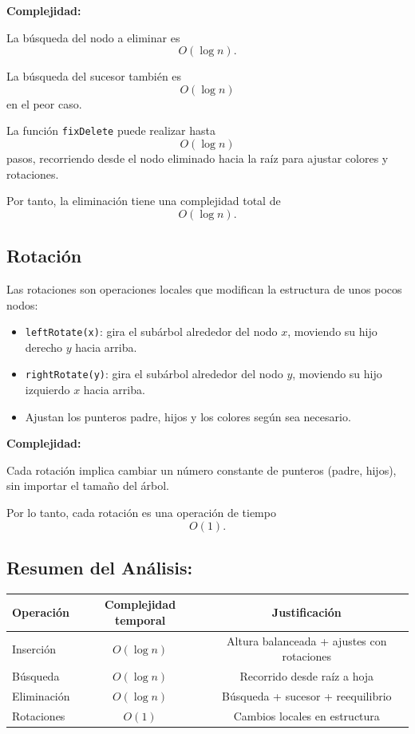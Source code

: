 \documentclass[conference]{IEEEtran}
\begin{document}
\textbf{Complejidad:}

La búsqueda del nodo a eliminar es 
\[
O(\log n).
\]

La búsqueda del sucesor también es 
\[
O(\log n)
\]
en el peor caso.

La función \texttt{fixDelete} puede realizar hasta 
\[
O(\log n)
\]
pasos, recorriendo desde el nodo eliminado hacia la raíz para ajustar colores y rotaciones.

Por tanto, la eliminación tiene una complejidad total de 
\[
O(\log n).
\]



\subsection{Rotación}
Las rotaciones son operaciones locales que modifican la estructura de unos pocos nodos:

\begin{itemize}
    \item \texttt{leftRotate(x)}: gira el subárbol alrededor del nodo \(x\), moviendo su hijo derecho \(y\) hacia arriba.
    \item \texttt{rightRotate(y)}: gira el subárbol alrededor del nodo \(y\), moviendo su hijo izquierdo \(x\) hacia arriba.
    \item Ajustan los punteros padre, hijos y los colores según sea necesario.
\end{itemize}

\textbf{Complejidad:}

Cada rotación implica cambiar un número constante de punteros (padre, hijos), sin importar el tamaño del árbol.

Por lo tanto, cada rotación es una operación de tiempo 
\[
O(1).
\]

\subsection{Resumen del Análisis:}

\begin{table}[h]
\centering
\begin{tabular}{l c c}
\hline
\textbf{Operación} & \textbf{Complejidad temporal} & \textbf{Justificación} \\
\hline
Inserción   & \(O(\log n)\) & Altura balanceada + ajustes con rotaciones \\
Búsqueda    & \(O(\log n)\) & Recorrido desde raíz a hoja \\
Eliminación & \(O(\log n)\) & Búsqueda + sucesor + reequilibrio \\
Rotaciones  & \(O(1)\)      & Cambios locales en estructura \\
\hline
\end{tabular}

\end{table}
\end{document}
